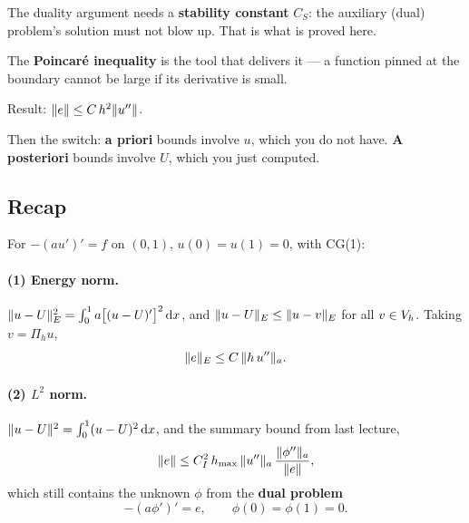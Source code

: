 
\begin{roadmap}[Lecture 8]
\begin{roadlist}
\item The duality argument needs a \textbf{stability constant} $C_{S}$: the
  auxiliary (dual) problem's solution must not blow up. That is what is proved
  here.
\item The \textbf{Poincar\'e inequality} is the tool that delivers it --- a
  function pinned at the boundary cannot be large if its derivative is small.
\item Result: $\lVert e\rVert\le C\,h^{2}\lVert u''\rVert$.
\item Then the switch: \textbf{a priori} bounds involve $u$, which you do not
  have. \textbf{A posteriori} bounds involve $U$, which you just computed.
\end{roadlist}
\end{roadmap}

\subsection*{Recap}

For $-(au')'=f$ on $(0,1)$, $u(0)=u(1)=0$, with CG(1):

\paragraph{(1) Energy norm.}
$\lVert u-U\rVert_{E}^{2}=\int_0^1 a\bigl[(u-U)'\bigr]^{2}\,\mathrm{d} x$, and
$\lVert u-U\rVert_{E}\le\lVert u-v\rVert_{E}$ for all $v\in V_{h}$. Taking $v=\Pi_h u$,
\begin{equation}\label{eq:l8e}
  \lVert e\rVert_{E}\le C\,\lVert h\,u''\rVert_{a}.
\end{equation}

\paragraph{(2) $L^{2}$ norm.}
$\lVert u-U\rVert^{2}=\int_0^1 (u-U)^{2}\,\mathrm{d} x$, and the summary bound from last lecture,
\begin{equation}\label{eq:l8summary}
  \lVert e\rVert\le C_{I}^{2}\,h_{\max}\,\lVert u''\rVert_{a}\,
              \frac{\lVert\phi''\rVert_{a}}{\lVert e\rVert},
\end{equation}
which still contains the unknown $\phi$ from the \textbf{dual problem}
\begin{equation}\label{eq:l8dual}
  -(a\phi')'=e,\qquad \phi(0)=\phi(1)=0 .
\end{equation}


